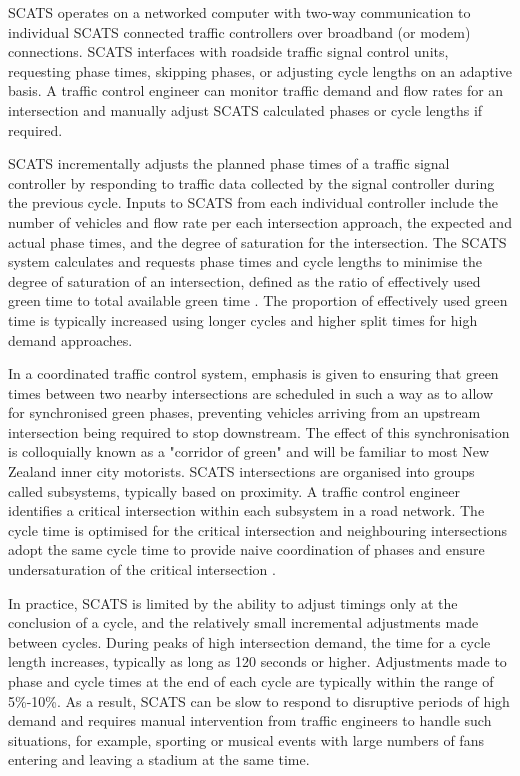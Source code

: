  SCATS operates on a networked computer with two-way communication to individual SCATS connected traffic controllers over broadband (or modem) connections. SCATS interfaces with roadside traffic signal control units, requesting phase times, skipping phases, or adjusting cycle lengths on an adaptive basis. A traffic control engineer can monitor traffic demand and flow rates for an intersection and manually adjust SCATS calculated phases or cycle lengths if required.

SCATS incrementally adjusts the planned phase times of a traffic signal controller by responding to traffic data collected by the signal controller during the previous cycle. Inputs to SCATS from each individual controller include the number of vehicles and flow rate per each intersection approach, the expected and actual phase times, and the degree of saturation for the intersection.  The SCATS system calculates and requests phase times and cycle lengths to minimise the degree of saturation of an intersection, defined as the ratio of effectively used green time to total available green time \cite{wolshon1999scats}. The proportion of effectively used green time is typically increased using longer cycles and higher split times for high demand approaches. 

In a coordinated traffic control system, emphasis is given to ensuring that green times between two nearby intersections are scheduled in such a way as to allow for synchronised green phases, preventing vehicles arriving from an upstream intersection being required to stop downstream. The effect of this synchronisation is colloquially known as a "corridor of green" and will be familiar to most New Zealand inner city motorists. SCATS intersections are organised into groups called subsystems, typically based on proximity. A traffic control engineer identifies a critical intersection within each subsystem in a road network. The cycle time is optimised for the critical intersection and neighbouring intersections adopt the same cycle time to provide naive coordination of phases and ensure undersaturation of the critical intersection \cite{kilby2010rta}.

In practice, SCATS is limited by the ability to adjust timings only at the conclusion of a cycle, and the relatively small incremental adjustments made between cycles. During peaks of high intersection demand, the time for a cycle length increases, typically as long as 120 seconds or higher. Adjustments made to phase and cycle times at the end of each cycle are typically within the range of 5\%-10\%. As a result, SCATS can be slow to respond to disruptive periods of high demand and requires manual intervention from traffic engineers to handle such situations, for example, sporting or musical events with large numbers of fans entering and leaving a stadium at the same time. 

